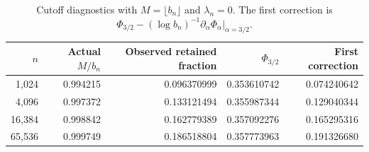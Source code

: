 \begin{table}[htbp]\centering\small
\begin{tabular}{rrrrr}\toprule
$n$ & Actual $M/b_n$ & Observed retained fraction & $\Phi_{3/2}$ & First correction\\\midrule
1,024 & 0.994215 & 0.096370999 & 0.353610742 & 0.074240642 \\
4,096 & 0.997372 & 0.133121494 & 0.355987344 & 0.129040344 \\
16,384 & 0.998842 & 0.162779389 & 0.357092276 & 0.165295316 \\
65,536 & 0.999749 & 0.186518804 & 0.357773963 & 0.191326680 \\
\bottomrule\end{tabular}
\caption{Cutoff diagnostics with $M=\lfloor b_n\rfloor$ and $\lambda_n=0$. The first correction is $\Phi_{3/2}-(\log b_n)^{-1}\partial_\alpha\Phi_\alpha|_{\alpha=3/2}$.}\label{tab:cut}
\end{table}
